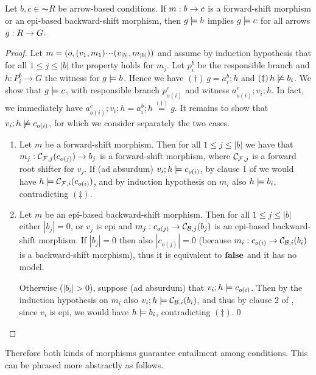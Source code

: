 \begin{proposition}
Let $b,c \in \AC{R}$  be arrow-based conditions. If $m:b\rightarrow c$ is a forward-shift morphism or an epi-based backward-shift morphism, then $g\models b$ implies $g \models c$ for all arrows $g:R\rightarrow G$. 
\end{proposition}

\begin{proof}
Let $m = (o,(v_1,m_1){\cdotp\mkern-2mu\cdotp\mkern-2mu\cdotp\mkern1mu} (v_{|b|},m_{|b|}))$ and assume by induction hypothesis that for all $1\leq j\leq |b|$ the property holds for $m_j$. Let $p^b_i$ be the responsible branch and $h: P^b_i \to G$ the witness for $g\models b$. 
Hence we have $(\dagger)\, g=a^b_i;h$ and $(\ddagger)\, h \not\models b_i$.  
We show that $g \models c$, with responsible branch $p^c_{o(i)}$ and witness $a^c_{o(i)}; v_i ;h$. In fact, we immediately have  $a^c_{o(i)}; v_i ;h = a^b_i ; h \stackrel{(\dagger)}{=} g$. It remains to show that $v_i ;h \not\models c_{o(i)}$, for which we consider separately the two cases.
\begin{enumerate}
\item Let $m$ be a forward-shift morphism. Then for all $1\leq j\leq |b|$ we have that   $m_j:\mathcal{C}_{\mathcal{F},j}(c_{o(j)}) \to b_j$ is a forward-shift morphism, where $\mathcal{C}_{\mathcal{F},j}$ is a forward root shifter for $v_j$. If (ad absurdum) $v_i ;h \models c_{o(i)}$, by clause 1 of  we would have $h \models \mathcal{C}_{\mathcal{F},i}(c_{o(i)})$, and by induction hypothesis on $m_i$ also $h \models b_i$, contradicting $(\ddagger)$.

\item Let $m$ be an epi-based backward-shift morphism. Then for all $1\leq j\leq |b|$  either $|b_j| =0$, or $v_j$ is epi and $m_j:c_{o(j)}\to \mathcal{C}_{\mathcal{B},j}(b_j)$ is an epi-based backward-shift morphism. If $|b_j| =0$ then also $|c_{o(j)}| = 0$ (because $m_i:c_{o(i)}\to \mathcal{C}_{\mathcal{B},i}(b_i)$ is a backward-shift morphism), thus it is equivalent to $\textbf{false}$ and it has no model.

Otherwise ($|b_i| > 0$), suppose (ad absurdum) that $v_i ;h \models c_{o(i)}$. Then by the induction hypothesis on $m_i$ also $v_i ;h \models \mathcal{C}_{\mathcal{B},i}(b_i)$,  and thus by clause 2 of , since $v_i$ is epi, we would have $h \models b_i$, contradicting $(\ddagger)$.\qed
\end{enumerate}
\end{proof}
%
Therefore both kinds of morphisms guarantee entailment among conditions. This can be phrased more abstractly as follows.

